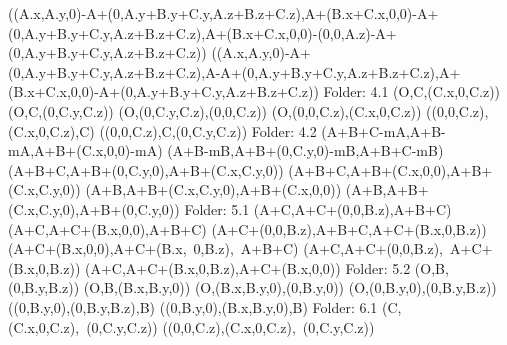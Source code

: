 \left(\left(A.x,A.y,0\right)-A+\left(0,A.y+B.y+C.y,A.z+B.z+C.z\right),A+\left(B.x+C.x,0,0\right)-A+\left(0,A.y+B.y+C.y,A.z+B.z+C.z\right),A+\left(B.x+C.x,0,0\right)-\left(0,0,A.z\right)-A+\left(0,A.y+B.y+C.y,A.z+B.z+C.z\right)\right)
\left(\left(A.x,A.y,0\right)-A+\left(0,A.y+B.y+C.y,A.z+B.z+C.z\right),A-A+\left(0,A.y+B.y+C.y,A.z+B.z+C.z\right),A+\left(B.x+C.x,0,0\right)-A+\left(0,A.y+B.y+C.y,A.z+B.z+C.z\right)\right)
Folder: 4.1
\left(O,C,\left(C.x,0,C.z\right)\right)
\left(O,C,\left(0,C.y,C.z\right)\right)
\left(O,\left(0,C.y,C.z\right),\left(0,0,C.z\right)\right)
\left(O,\left(0,0,C.z\right),\left(C.x,0,C.z\right)\right)
\left(\left(0,0,C.z\right),\left(C.x,0,C.z\right),C\right)
\left(\left(0,0,C.z\right),C,\left(0,C.y,C.z\right)\right)
Folder: 4.2
\left(A+B+C-mA,A+B-mA,A+B+\left(C.x,0,0\right)-mA\right)
\left(A+B-mB,A+B+\left(0,C.y,0\right)-mB,A+B+C-mB\right)
\left(A+B+C,A+B+\left(0,C.y,0\right),A+B+\left(C.x,C.y,0\right)\right)
\left(A+B+C,A+B+\left(C.x,0,0\right),A+B+\left(C.x,C.y,0\right)\right)
\left(A+B,A+B+\left(C.x,C.y,0\right),A+B+\left(C.x,0,0\right)\right)
\left(A+B,A+B+\left(C.x,C.y,0\right),A+B+\left(0,C.y,0\right)\right)
Folder: 5.1
\left(A+C,A+C+\left(0,0,B.z\right),A+B+C\right)
\left(A+C,A+C+\left(B.x,0,0\right),A+B+C\right)
\left(A+C+\left(0,0,B.z\right),A+B+C,A+C+\left(B.x,0,B.z\right)\right)
\left(A+C+\left(B.x,0,0\right),A+C+\left(B.x,\ 0,B.z\right),\ A+B+C\right)
\left(A+C,A+C+\left(0,0,B.z\right),\ A+C+\left(B.x,0,B.z\right)\right)
\left(A+C,A+C+\left(B.x,0,B.z\right),A+C+\left(B.x,0,0\right)\right)
Folder: 5.2
\left(O,B,\left(0,B.y,B.z\right)\right)
\left(O,B,\left(B.x,B.y,0\right)\right)
\left(O,\left(B.x,B.y,0\right),\left(0,B.y,0\right)\right)
\left(O,\left(0,B.y,0\right),\left(0,B.y,B.z\right)\right)
\left(\left(0,B.y,0\right),\left(0,B.y,B.z\right),B\right)
\left(\left(0,B.y,0\right),\left(B.x,B.y,0\right),B\right)
Folder: 6.1
\left(C,\left(C.x,0,C.z\right),\ \left(0,C.y,C.z\right)\right)
\left(\left(0,0,C.z\right),\left(C.x,0,C.z\right),\ \left(0,C.y,C.z\right)\right)
